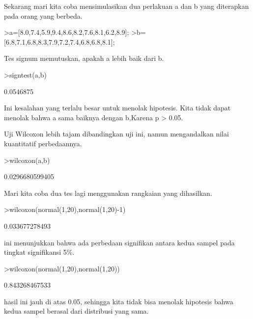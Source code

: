 \documentclass[a4paper,10pt]{article}
\begin{document}
\begin{eulernotebook}
\begin{eulercomment}
\begin{eulercomment}
\begin{eulercomment}
\begin{eulercomment}
\begin{eulercomment}
Sekarang mari kita coba mensimulasikan dua perlakuan a dan b yang
diterapkan pada orang yang berbeda.
\end{eulercomment}
\begin{eulerprompt}
>a=[8.0,7.4,5.9,9.4,8.6,8.2,7.6,8.1,6.2,8.9];
>b=[6.8,7.1,6.8,8.3,7.9,7.2,7.4,6.8,6.8,8.1];
\end{eulerprompt}
\begin{eulercomment}
Tes signum memutuskan, apakah a lebih baik dari b.
\end{eulercomment}
\begin{eulerprompt}
>signtest(a,b)
\end{eulerprompt}
\begin{euleroutput}
  0.0546875
\end{euleroutput}
\begin{eulercomment}
Ini kesalahan yang terlalu besar untuk menolak hipotesis. Kita tidak
dapat menolak bahwa a sama baiknya dengan b,Karena p \textgreater{} 0.05.

Uji Wilcoxon lebih tajam dibandingkan uji ini, namun mengandalkan
nilai kuantitatif perbedaannya.
\end{eulercomment}
\begin{eulerprompt}
>wilcoxon(a,b)
\end{eulerprompt}
\begin{euleroutput}
  0.0296680599405
\end{euleroutput}
\begin{eulercomment}
Mari kita coba dua tes lagi menggunakan rangkaian yang dihasilkan.
\end{eulercomment}
\begin{eulerprompt}
>wilcoxon(normal(1,20),normal(1,20)-1)
\end{eulerprompt}
\begin{euleroutput}
  0.033677278493
\end{euleroutput}
\begin{eulercomment}
ini menunjukkan bahwa ada perbedaan signifikan antara kedua sampel
pada tingkat signifikansi 5\%.
\end{eulercomment}
\begin{eulerprompt}
>wilcoxon(normal(1,20),normal(1,20))
\end{eulerprompt}
\begin{euleroutput}
  0.843268467533
\end{euleroutput}
\begin{eulercomment}
hasil ini  jauh di atas 0.05, sehingga kita tidak bisa menolak
hipotesis bahwa kedua sampel berasal dari distribusi yang sama.


\end{eulercomment}
\end{eulercomment}
\end{eulercomment}
\end{eulercomment}
\end{eulercomment}
\end{eulernotebook}
\end{document}
